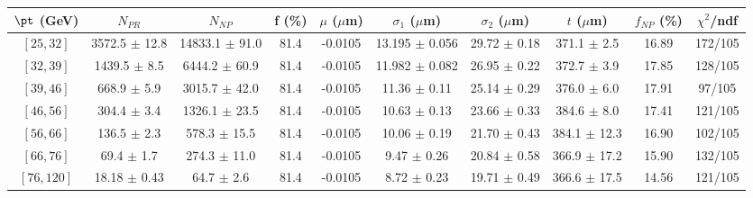\begin{tabular}{c||c|c|c|c|c|c|c||c|c}
$\pt$ (GeV) & $N_{PR}$ & $N_{NP}$ & f (\%) & $\mu$ ($\mu$m) & $\sigma_1$ ($\mu$m) & $\sigma_2$ ($\mu$m)  & $t$ ($\mu$m) & $f_{NP}$ (\%) & $\chi^2$/ndf \\
\hline
$[25, 32]$ & 3572.5 $\pm$ 12.8 & 14833.1 $\pm$ 91.0 & 81.4 & -0.0105 & 13.195 $\pm$ 0.056 & 29.72 $\pm$ 0.18 & 371.1 $\pm$ 2.5 & 16.89 & 172/105\\
$[32, 39]$ & 1439.5 $\pm$ 8.5 & 6444.2 $\pm$ 60.9 & 81.4 & -0.0105 & 11.982 $\pm$ 0.082 & 26.95 $\pm$ 0.22 & 372.7 $\pm$ 3.9 & 17.85 & 128/105\\
$[39, 46]$ & 668.9 $\pm$ 5.9 & 3015.7 $\pm$ 42.0 & 81.4 & -0.0105 & 11.36 $\pm$ 0.11 & 25.14 $\pm$ 0.29 & 376.0 $\pm$ 6.0 & 17.91 & 97/105\\
$[46, 56]$ & 304.4 $\pm$ 3.4 & 1326.1 $\pm$ 23.5 & 81.4 & -0.0105 & 10.63 $\pm$ 0.13 & 23.66 $\pm$ 0.33 & 384.6 $\pm$ 8.0 & 17.41 & 121/105\\
$[56, 66]$ & 136.5 $\pm$ 2.3 & 578.3 $\pm$ 15.5 & 81.4 & -0.0105 & 10.06 $\pm$ 0.19 & 21.70 $\pm$ 0.43 & 384.1 $\pm$ 12.3 & 16.90 & 102/105\\
$[66, 76]$ & 69.4 $\pm$ 1.7 & 274.3 $\pm$ 11.0 & 81.4 & -0.0105 & 9.47 $\pm$ 0.26 & 20.84 $\pm$ 0.58 & 366.9 $\pm$ 17.2 & 15.90 & 132/105\\
$[76, 120]$ & 18.18 $\pm$ 0.43 & 64.7 $\pm$ 2.6 & 81.4 & -0.0105 & 8.72 $\pm$ 0.23 & 19.71 $\pm$ 0.49 & 366.6 $\pm$ 17.5 & 14.56 & 121/105\\
\end{tabular}
